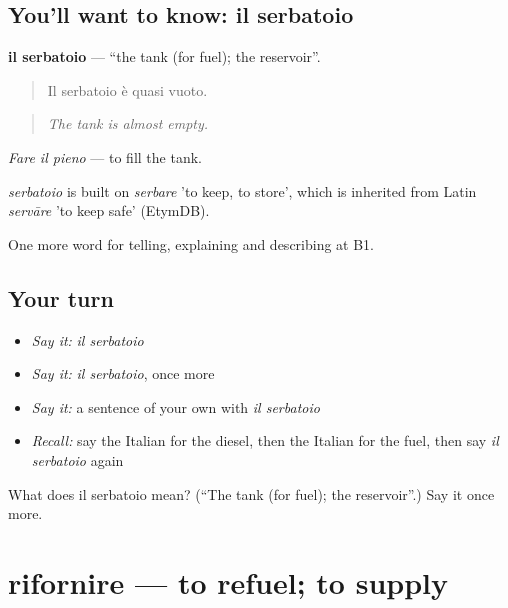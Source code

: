 \subsection*{You'll want to know: il serbatoio}
\textbf{il serbatoio} — \textquotedblleft{}the tank (for fuel); the reservoir\textquotedblright{}.

\begin{quote}
Il serbatoio è quasi vuoto.
\end{quote}

\begin{quote}
\emph{The tank is almost empty.}
\end{quote}

\emph{Fare il pieno} — to fill the tank.

\begin{cousinweb}
\emph{serbatoio} is built on \emph{serbare} 'to keep, to store', which is inherited from Latin \emph{servāre} 'to keep safe' (EtymDB).
\end{cousinweb}

\begin{grammarlens}[title={What you've built}]
One more word for telling, explaining and describing at B1.
\end{grammarlens}

\subsection*{Your turn}
\begin{itemize}
\raggedright
  \item \emph{Say it:} \emph{il serbatoio}
  \item \emph{Say it:} \emph{il serbatoio}, once more
  \item \emph{Say it:} a sentence of your own with \emph{il serbatoio}
  \item \emph{Recall:} say the Italian for the diesel, then the Italian for the fuel, then say \emph{il serbatoio} again
\end{itemize}

\begin{tcolorbox}[breakable,colback=teal!4,colframe=teal!35!black,title={Before you move on}]
What does il serbatoio mean? (\textquotedblleft{}The tank (for fuel); the reservoir\textquotedblright{}.) Say it once more.
\end{tcolorbox}
\section[rifornire]{rifornire — to refuel; to supply}

